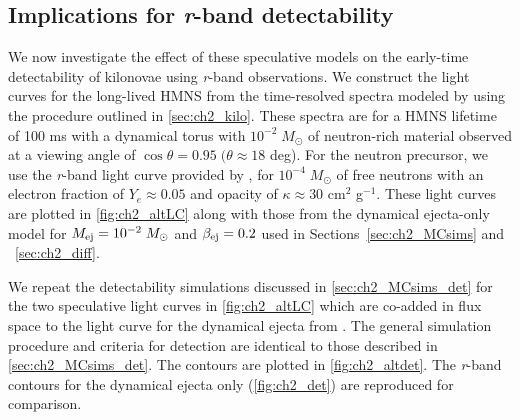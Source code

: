 \subsection{Implications for {\em r}-band detectability}
\label{sec:ch2_altkilo_det}
We now investigate the effect of these speculative models on the early-time detectability of kilonovae using {\em r}-band observations. We construct the light curves for the long-lived HMNS from the time-resolved spectra modeled by \citet{Kasen+15} using the procedure outlined in \autoref{sec:ch2_kilo}. These spectra are for a HMNS lifetime of 100 ms with a dynamical torus with $10^{-2}\;M_{\odot}$ of neutron-rich material observed at a viewing angle of $\cos{\theta} = 0.95\; (\theta \approx 18$ deg). For the neutron precursor, we use the {\em r}-band light curve provided by \citet{Metzger+15}, for $10^{-4}\;M_{\odot}$ of free neutrons with an electron fraction of $Y_e \approx 0.05$ and opacity of $\kappa \approx 30$ cm$^2$ g$^{-1}$. These light curves are plotted in \autoref{fig:ch2_altLC} along with those from the dynamical ejecta-only model for $M_{{\rm ej}} = 10^{-2}\;M_{\odot}$ and $\beta_{{\rm ej}} = 0.2$ used in Sections~\ref{sec:ch2_MCsims} and ~\ref{sec:ch2_diff}.

We repeat the detectability simulations discussed in \autoref{sec:ch2_MCsims_det} for the two speculative light curves in \autoref{fig:ch2_altLC} which are co-added in flux space to the light curve for the dynamical ejecta from \citet{BarnesKasen13}. The general simulation procedure and criteria for detection are identical to those described in \autoref{sec:ch2_MCsims_det}. The contours are plotted in \autoref{fig:ch2_altdet}. The {\em r}-band contours for the dynamical ejecta only (\autoref{fig:ch2_det}) are reproduced for comparison.

